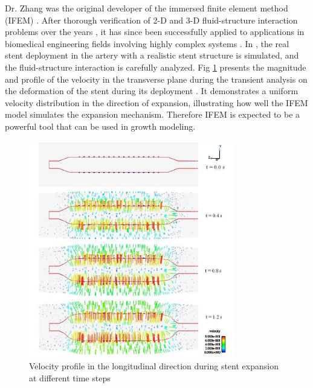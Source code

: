 \documentclass[12pt]{article}
\begin{document}
Dr. Zhang was the original developer of the immersed finite element method (IFEM) \cite{Zhang}. After thorough verification of 2-D and 3-D fluid-structure interaction problems over the years \cite{Zhang,Zhang2,Zhang3,Zhang4,Zhang5,Zhang6,Zhang7,Zhang8} , it has since been successfully applied to applications in biomedical engineering fields involving highly complex systems \cite{Zhang9,Zhang10,Zhang11,Zhang12,Zhang13,Zhang14,Zhang15,Zhang18}. In \cite{Zhang10}, the real stent deployment in the artery with a realistic stent structure is simulated, and the fluid-structure interaction is carefully analyzed. Fig \ref{fig:IFEM_stent} presents the magnitude and profile of the velocity in the transverse plane during the transient analysis on the deformation of the stent during its deployment \cite{Zhang10}. It demonstrates a uniform velocity distribution in the direction of expansion, illustrating how well the IFEM model simulates the expansion mechanism. Therefore IFEM is expected to be a powerful tool that can be used in growth modeling. 
\begin{figure}[H]
	\centering
	\includegraphics[width=0.8\textwidth]{./figs/IFEM_stent.jpg}
	\caption{Velocity profile in the longitudinal direction during stent expansion at different time steps}
	\label{fig:IFEM_stent}
\end{figure}
\end{document}
